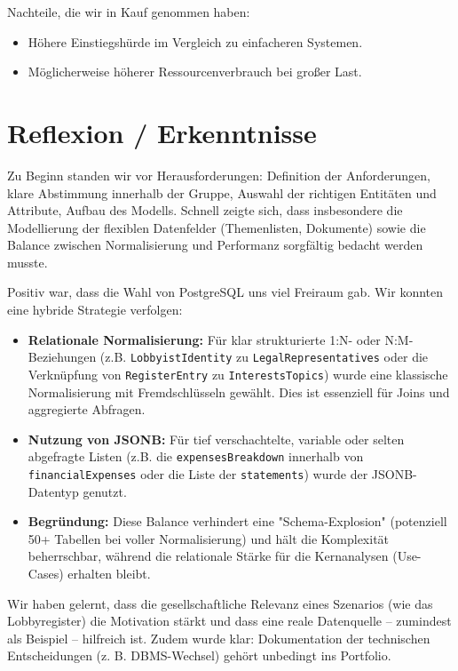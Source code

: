 \documentclass[12pt,twoside=false,a4paper,parskip]{scrbook}
\begin{document}
Nachteile, die wir in Kauf genommen haben:

\begin{itemize}
\item Höhere Einstiegshürde im Vergleich zu einfacheren Systemen.
\item Möglicherweise höherer Ressourcenverbrauch bei großer Last.
\end{itemize}

\chapter{Reflexion / Erkenntnisse}
Zu Beginn standen wir vor Herausforderungen: Definition der Anforderungen, klare Abstimmung innerhalb der Gruppe, Auswahl der richtigen Entitäten und Attribute, Aufbau des Modells. Schnell zeigte sich, dass insbesondere die Modellierung der flexiblen Datenfelder (Themenlisten, Dokumente) sowie die Balance zwischen Normalisierung und Performanz sorgfältig bedacht werden musste.

Positiv war, dass die Wahl von PostgreSQL uns viel Freiraum gab. Wir konnten eine hybride Strategie verfolgen:

\begin{itemize}
\item \textbf{Relationale Normalisierung:} Für klar strukturierte 1:N- oder N:M-Beziehungen (z.B. \texttt{LobbyistIdentity} zu \texttt{LegalRepresentatives} oder die Verknüpfung von \texttt{RegisterEntry} zu \texttt{InterestsTopics}) wurde eine klassische Normalisierung mit Fremdschlüsseln gewählt. Dies ist essenziell für Joins und aggregierte Abfragen.

\item \textbf{Nutzung von JSONB:} Für tief verschachtelte, variable oder selten abgefragte Listen (z.B. die \texttt{expensesBreakdown} innerhalb von \texttt{financialExpenses} oder die Liste der \texttt{statements}) wurde der JSONB-Datentyp genutzt.

\item \textbf{Begründung:} Diese Balance verhindert eine "Schema-Explosion" (potenziell 50+ Tabellen bei voller Normalisierung) und hält die Komplexität beherrschbar, während die relationale Stärke für die Kernanalysen (Use-Cases) erhalten bleibt.
\end{itemize}

Wir haben gelernt, dass die gesellschaftliche Relevanz eines Szenarios (wie das Lobbyregister) die Motivation stärkt und dass eine reale Datenquelle – zumindest als Beispiel – hilfreich ist. Zudem wurde klar: Dokumentation der technischen Entscheidungen (z. B. DBMS-Wechsel) gehört unbedingt ins Portfolio.
\end{document}
